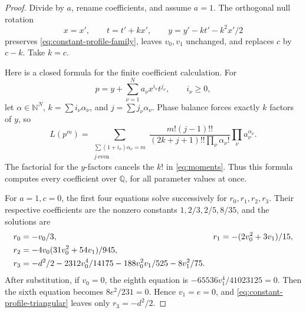 \begin{proof}
Divide by \(a\), rename coefficients, and assume \(a=1\).
The orthogonal null rotation
\begin{equation}
 x=x',\qquad t=t'+kx',\qquad y=y'-kt'-k^2x'/2
 \label{eq:constant-profile-null-rotation}
\end{equation}
preserves \eqref{eq:constant-profile-family}, leaves \(v_0,v_1\)
unchanged, and replaces \(c\) by \(c-k\). Take \(k=c\).

Here is a closed formula for the finite coefficient calculation. For
\[
 p=y+\sum_{\nu=1}^N a_\nu x^{i_\nu}t^{j_\nu},\qquad i_\nu\ge0,
\]
let \(\alpha\in\mathbb N^N\),
\(k=\sum i_\nu\alpha_\nu\), and \(j=\sum j_\nu\alpha_\nu\).
Phase balance forces exactly \(k\) factors of \(y\), so
\begin{equation}
 L(p^m)=
 \sum_{\substack{\sum(1+i_\nu)\alpha_\nu=m\\j\ \mathrm{even}}}
 \frac{m!(j-1)!!}{(2k+j+1)!!\prod_\nu\alpha_\nu!}
 \prod_\nu a_\nu^{\alpha_\nu}.
 \label{eq:constant-profile-coefficients}
\end{equation}
The factorial for the \(y\)-factors cancels the \(k!\) in
\eqref{eq:moments}. Thus this formula computes every
coefficient over \(\mathbb Q\), for all parameter values at once.

For \(a=1,c=0\), the first four equations solve successively for
\(r_0,r_1,r_2,r_3\). Their respective coefficients are the nonzero
constants \(1,2/3,2/5,8/35\), and the solutions are
\begin{align}
 r_0&=-v_0/3,&
 r_1&=-(2v_0^2+3v_1)/15,\notag\\
 r_2&=-4v_0(31v_0^2+54v_1)/945,\notag\\
 r_3&=-d^2/2-2312v_0^4/14175-188v_0^2v_1/525-8v_1^2/75.
 \label{eq:constant-profile-triangular}
\end{align}
After substitution, if \(v_0=0\), the eighth equation is
\(-65536v_1^4/41023125=0\). Then the sixth equation becomes
\(8e^2/231=0\). Hence \(v_1=e=0\), and
\eqref{eq:constant-profile-triangular} leaves only \(r_3=-d^2/2\).


\end{proof}
